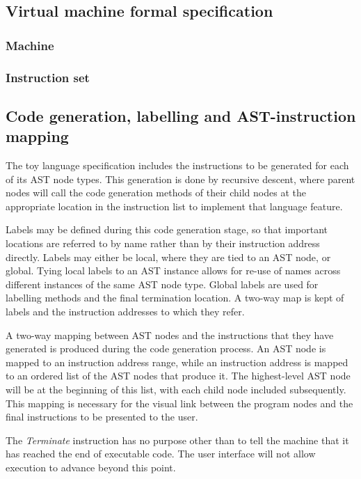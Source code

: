 \subsection{Virtual machine formal specification}

\subsubsection{Machine}

\subsubsection{Instruction set}

\subsection{Code generation, labelling and AST-instruction mapping}

The toy language specification includes the instructions to be generated for each of its AST node types. This generation is done by recursive descent, where parent nodes will call the code generation methods of their child nodes at the appropriate location in the instruction list to implement that language feature.

Labels may be defined during this code generation stage, so that important locations are referred to by name rather than by their instruction address directly. Labels may either be local, where they are tied to an AST node, or global. Tying local labels to an AST instance allows for re-use of names across different instances of the same AST node type. Global labels are used for labelling methods and the final termination location. A two-way map is kept of labels and the instruction addresses to which they refer. 

A two-way mapping between AST nodes and the instructions that they have generated is produced during the code generation process. An AST node is mapped to an instruction address range, while an instruction address is mapped to an ordered list of the AST nodes that produce it. The highest-level AST node will be at the beginning of this list, with each child node included subsequently. This mapping is necessary for the visual link between the program nodes and the final instructions to be presented to the user.

The \textit{Terminate} instruction has no purpose other than to tell the machine that it has reached the end of executable code. The user interface will not allow execution to advance beyond this point. 

